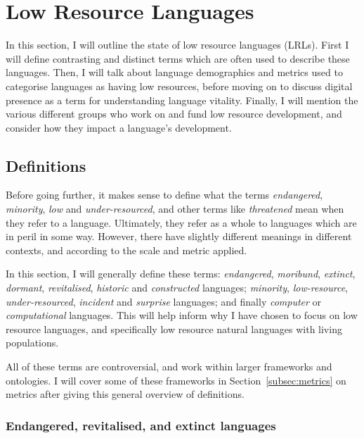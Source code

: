 \section{Low Resource Languages}
\label{sec:endlang}

In this section, I will outline the state of low resource languages (LRLs). First I will define contrasting and distinct terms which are often used to describe these languages. Then, I will talk about language demographics and metrics used to categorise languages as having low resources, before moving on to discuss digital presence as a term for understanding language vitality. Finally, I will mention the various different groups who work on and fund low resource development, and consider how they impact a language's development.


\subsection{Definitions}

Before going further, it makes sense to define what the terms \emph{endangered}, \emph{minority}, \emph{low} and \emph{under-resourced}, and other terms like \emph{threatened} mean when they refer to a language. Ultimately, they refer as a whole to languages which are in peril in some way. However, there have slightly different meanings in different contexts, and according to the scale and metric applied.

In this section, I will generally define these terms: \textit{endangered}, \textit{moribund}, \textit{extinct}, \textit{dormant}, \textit{revitalised}, \textit{historic} and \textit{constructed} languages; \textit{minority}, \textit{low-resource}, \textit{under-resourced}, \textit{incident} and \textit{surprise} languages; and finally \textit{computer} or \textit{computational} languages. This will help inform why I have chosen to focus on low resource languages, and specifically low resource natural languages with living populations.

All of these terms are controversial, and work within larger frameworks and ontologies. I will cover some of these frameworks in Section~\ref{subsec:metrics} on metrics after giving this general overview of definitions.

\subsubsection{Endangered, revitalised, and extinct languages}

